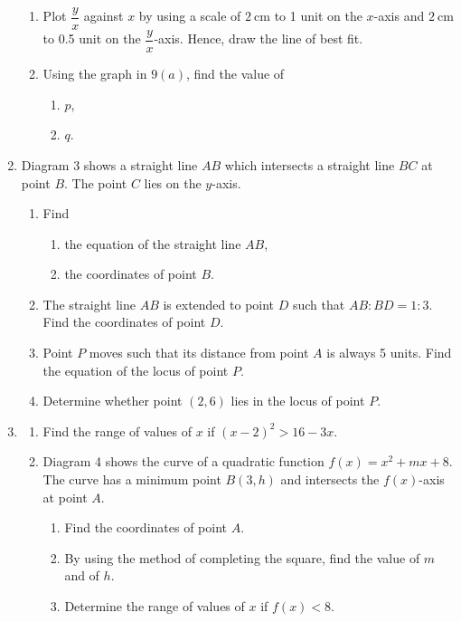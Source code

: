 \documentclass{report}
\begin{document}
\begin{enumerate}[leftmargin=*]
          \begin{enumerate}
              \item Plot $\dfrac{y}{x}$ against $x$ by using a scale of $2 \mathrm{~cm}$ to 1 unit
                    on the $x$-axis and $2 \mathrm{~cm}$ to 0.5 unit on the $\dfrac{y}{x}$-axis.
                    Hence, draw the line of best fit.
              \item Using the graph in $9(a)$, find the value of
                    \begin{enumerate}
                        \item $p$,
                        \item $q$.
                    \end{enumerate}
          \end{enumerate}

    \item Diagram 3 shows a straight line $A B$ which intersects a straight line $B C$ at
          point $B$. The point $C$ lies on the $y$-axis.
          \begin{enumerate}
              \item Find
                    \begin{enumerate}
                        \item the equation of the straight line $A B$,
                        \item the coordinates of point $B$.
                    \end{enumerate}

              \item The straight line $A B$ is extended to point $D$ such that $A B: B D=1: 3$.
                    Find the coordinates of point $D$.
              \item Point $P$ moves such that its distance from point $A$ is always 5 units. Find
                    the equation of the locus of point $P$.

              \item Determine whether point $(2,6)$ lies in the locus of point $P$.
          \end{enumerate}
    \item \begin{enumerate}
              \item Find the range of values of $x$ if $(x-2)^2>16-3 x$.
              \item Diagram 4 shows the curve of a quadratic function $f(x)=x^2+m x+8$. The curve
                    has a minimum point $B(3, h)$ and intersects the $f(x)$-axis at point $A$.
                    \begin{enumerate}
                        \item Find the coordinates of point $A$.
                        \item By using the method of completing the square, find the value of $m$ and of $h$. \item Determine the range of values of $x$ if $f(x)<8$.
                    \end{enumerate}
          \end{enumerate}
\end{enumerate}
\end{document}
